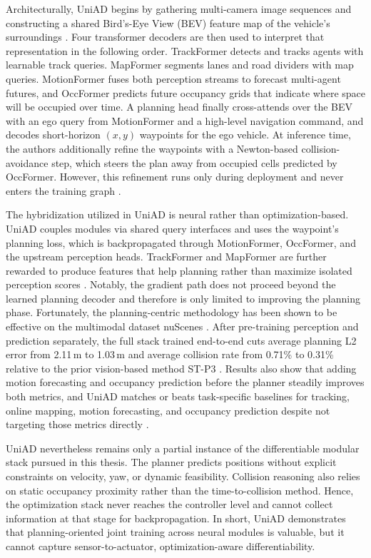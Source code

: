 Architecturally, UniAD begins by gathering multi-camera image sequences and constructing a shared Bird's-Eye View (BEV) feature map of the vehicle's surroundings \cite{hu_planning-UniAD_2023}.
Four transformer decoders are then used to interpret that representation in the following order.
TrackFormer detects and tracks agents with learnable track queries. MapFormer segments lanes and road dividers with map queries.
MotionFormer fuses both perception streams to forecast multi-agent futures, and OccFormer predicts future occupancy grids that indicate where space will be occupied over time.
A planning head finally cross-attends over the BEV with an ego query from MotionFormer and a high-level navigation command, and decodes short-horizon $(x,y)$ waypoints for the ego vehicle.
At inference time, the authors additionally refine the waypoints with a Newton-based collision-avoidance step, which steers the plan away from occupied cells predicted by OccFormer.
However, this refinement runs only during deployment and never enters the training graph \cite{hu_planning-UniAD_2023}.

The hybridization utilized in UniAD is neural rather than optimization-based.
UniAD couples modules via shared query interfaces and uses the waypoint's planning loss, which is backpropagated through MotionFormer, OccFormer, and the upstream perception heads.
TrackFormer and MapFormer are further rewarded to produce features that help planning rather than maximize isolated perception scores \cite{hu_planning-UniAD_2023}.
Notably, the gradient path does not proceed beyond the learned planning decoder and therefore is only limited to improving the planning phase.
Fortunately, the planning-centric methodology has been shown to be effective on the multimodal dataset nuScenes \cite{caesar_nuScenesMultimodalDataset_2020}.
After pre-training perception and prediction separately, the full stack trained end-to-end cuts average planning L2 error from 2.11\,m to 1.03\,m and average collision rate from 0.71\% to 0.31\% relative to the prior vision-based method ST-P3 \cite{hu_planning-UniAD_2023}.
Results also show that adding motion forecasting and occupancy prediction before the planner steadily improves both metrics, and UniAD matches or beats task-specific baselines for tracking, online mapping, motion forecasting, and occupancy prediction despite not targeting those metrics directly \cite{hu_planning-UniAD_2023}.

UniAD nevertheless remains only a partial instance of the differentiable modular stack pursued in this thesis.
The planner predicts positions without explicit constraints on velocity, yaw, or dynamic feasibility.
Collision reasoning also relies on static occupancy proximity rather than the time-to-collision method.
Hence, the optimization stack never reaches the controller level and cannot collect information at that stage for backpropagation.
In short, UniAD demonstrates that planning-oriented joint training across neural modules is valuable, but it cannot capture sensor-to-actuator, optimization-aware differentiability.

